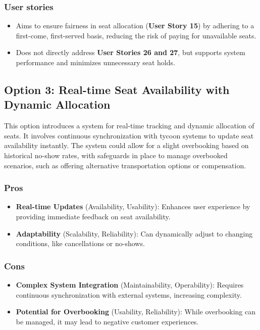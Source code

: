 \subsubsection*{User stories}
\begin{itemize}
    \item Aims to ensure fairness in seat allocation (\textbf{User Story 15}) by adhering to a first-come, first-served basis, reducing the risk of paying for unavailable seats.
    \item Does not directly address \textbf{User Stories 26 and 27}, but supports system performance and minimizes unnecessary seat holds.
\end{itemize}

\subsection*{Option 3: Real-time Seat Availability with Dynamic Allocation}
This option introduces a system for real-time tracking and dynamic allocation of seats. It involves continuous synchronization with tycoon systems to update seat availability instantly. The system could allow for a slight overbooking based on historical no-show rates, with safeguards in place to manage overbooked scenarios, such as offering alternative transportation options or compensation.

\subsubsection*{Pros}
\begin{itemize}[noitemsep]
    \item \textbf{Real-time Updates} (Availability, Usability): Enhances user experience by providing immediate feedback on seat availability.
    \item \textbf{Adaptability} (Scalability, Reliability): Can dynamically adjust to changing conditions, like cancellations or no-shows.
\end{itemize}
\subsubsection*{Cons}
\begin{itemize}[noitemsep]
    \item \textbf{Complex System Integration} (Maintainability, Operability): Requires continuous synchronization with external systems, increasing complexity.
    \item \textbf{Potential for Overbooking} (Usability, Reliability): While overbooking can be managed, it may lead to negative customer experiences.
\end{itemize}

